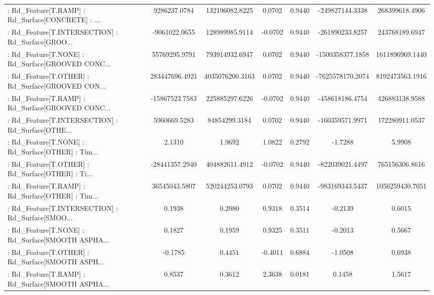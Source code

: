 \begin{longtable}{p{4cm}cccccc}
 : Rd\_Feature[T.RAMP] : Rd\_Surface[CONCRETE] : ... &      9286237.0784 &    132196082.8225 &  0.0702 &       0.9440 &    -249827144.3338 &    268399618.4906 \\
 : Rd\_Feature[T.INTERSECTION] : Rd\_Surface[GROO... &     -9061022.0655 &    128989985.9114 & -0.0702 &       0.9440 &    -261890233.8257 &    243768189.6947 \\
 : Rd\_Feature[T.NONE] : Rd\_Surface[GROOVED CONC... &     55769295.9791 &    793914932.6947 &  0.0702 &       0.9440 &   -1500358377.1858 &   1611896969.1440 \\
 : Rd\_Feature[T.OTHER] : Rd\_Surface[GROOVED CON... &    283447696.4921 &   4035076200.3163 &  0.0702 &       0.9440 &   -7625578170.2074 &   8192473563.1916 \\
 : Rd\_Feature[T.RAMP] : Rd\_Surface[GROOVED CONC... &    -15867523.7583 &    225885297.6226 & -0.0702 &       0.9440 &    -458618186.4754 &    426883138.9588 \\
 : Rd\_Feature[T.INTERSECTION] : Rd\_Surface[OTHE... &      5960669.5283 &     84854299.3184 &  0.0702 &       0.9440 &    -160359571.9971 &    172280911.0537 \\
 : Rd\_Feature[T.NONE] : Rd\_Surface[OTHER] : Tim... &            2.1310 &            1.9692 &  1.0822 &       0.2792 &            -1.7288 &            5.9908 \\
 : Rd\_Feature[T.OTHER] : Rd\_Surface[OTHER] : Ti... &    -28441357.2940 &    404882611.4912 & -0.0702 &       0.9440 &    -822039021.4497 &    765156306.8616 \\
 : Rd\_Feature[T.RAMP] : Rd\_Surface[OTHER] : Tim... &     36545043.5807 &    520244253.0793 &  0.0702 &       0.9440 &    -983169343.5437 &   1056259430.7051 \\
 : Rd\_Feature[T.INTERSECTION] : Rd\_Surface[SMOO... &            0.1938 &            0.2080 &  0.9318 &       0.3514 &            -0.2139 &            0.6015 \\
 : Rd\_Feature[T.NONE] : Rd\_Surface[SMOOTH ASPHA... &            0.1827 &            0.1959 &  0.9325 &       0.3511 &            -0.2013 &            0.5667 \\
 : Rd\_Feature[T.OTHER] : Rd\_Surface[SMOOTH ASPH... &           -0.1785 &            0.4451 & -0.4011 &       0.6884 &            -1.0508 &            0.6938 \\
 : Rd\_Feature[T.RAMP] : Rd\_Surface[SMOOTH ASPHA... &            0.8537 &            0.3612 &  2.3638 &       0.0181 &             0.1458 &            1.5617 \\

\end{longtable}
